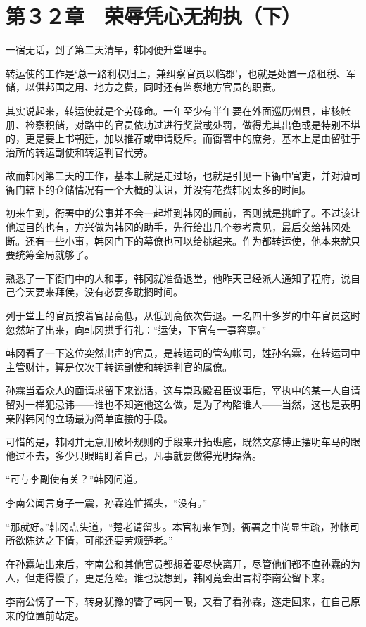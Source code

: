 \section{第３２章　荣辱凭心无拘执（下）}

一宿无话，到了第二天清早，韩冈便升堂理事。

转运使的工作是‘总一路利权归上，兼纠察官员以临郡’，也就是处置一路租税、军储，以供邦国之用、地方之费，同时还有监察地方官员的职责。

其实说起来，转运使就是个劳碌命。一年至少有半年要在外面巡历州县，审核帐册、检察积储，对路中的官员依功过进行奖赏或处罚，做得尤其出色或是特别不堪的，更是要上书朝廷，加以推荐或申请贬斥。而衙署中的庶务，基本上是由留驻于治所的转运副使和转运判官代劳。

故而韩冈第二天的工作，基本上就是走过场，也就是引见一下衙中官吏，并对漕司衙门辖下的仓储情况有一个大概的认识，并没有花费韩冈太多的时间。

初来乍到，衙署中的公事并不会一起堆到韩冈的面前，否则就是挑衅了。不过该让他过目的也有，方兴做为韩冈的助手，先行给出几个参考意见，最后交给韩冈处断。还有一些小事，韩冈门下的幕僚也可以给挑起来。作为都转运使，他本来就只要统筹全局就够了。

熟悉了一下衙门中的人和事，韩冈就准备退堂，他昨天已经派人通知了程府，说自己今天要来拜侯，没有必要多耽搁时间。

列于堂上的官员按着官品高低，从低到高依次告退。一名四十多岁的中年官员这时忽然站了出来，向韩冈拱手行礼：“运使，下官有一事容禀。”

韩冈看了一下这位突然出声的官员，是转运司的管勾帐司，姓孙名霖，在转运司中主管财计，算是仅次于转运副使和转运判官的属僚。

孙霖当着众人的面请求留下来说话，这与崇政殿君臣议事后，宰执中的某一人自请留对一样犯忌讳——谁也不知道他这么做，是为了构陷谁人——当然，这也是表明亲附韩冈的立场最为简单直接的手段。

可惜的是，韩冈并无意用破坏规则的手段来开拓班底，既然文彦博正摆明车马的跟他过不去，多少只眼睛盯着自己，凡事就要做得光明磊落。

“可与李副使有关？”韩冈问道。

李南公闻言身子一震，孙霖连忙摇头，“没有。”

“那就好。”韩冈点头道，“楚老请留步。本官初来乍到，衙署之中尚显生疏，孙帐司所欲陈达之下情，可能还要劳烦楚老。”

在孙霖站出来后，李南公和其他官员都想着要尽快离开，尽管他们都不直孙霖的为人，但走得慢了，更是危险。谁也没想到，韩冈竟会出言将李南公留下来。

李南公愣了一下，转身犹豫的瞥了韩冈一眼，又看了看孙霖，遂走回来，在自己原来的位置前站定。

